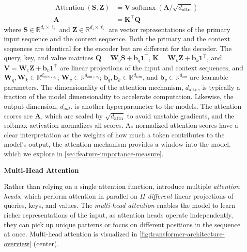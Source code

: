 \begin{equation}
    \begin{aligned}
        \operatorname{Attention}(\mathbf{S},\mathbf{Z}) & = \mathbf{V} \operatorname{softmax}\left(\mathbf{A} / \sqrt{d_{\mathrm{attn}}}\right) \\
        \mathbf{A}                                      & = \mathbf{K}^{\top} \mathbf{Q}
    \end{aligned}
    \label{eq:attention}
\end{equation}
where $\mathbf{S} \in \mathbb{R}^{d_s \times \ell_s}$ and $\mathbf{Z} \in \mathbb{R}^{d_z \times \ell_z}$ are vector representations of the primary input sequence and the context sequence. Both the primary and the context sequences are identical for the encoder but are different for the decoder. The query, key, and value matrices $\mathbf{Q}=\mathbf{W}_q \mathbf{S} + \mathbf{b}_q\mathbf{1}^{\top}$, $\mathbf{K}=\mathbf{W}_k \mathbf{Z} + \mathbf{b}_k\mathbf{1}^{\top}$, and $\mathbf{V}=\mathbf{W}_v \mathbf{Z} + \mathbf{b}_v\mathbf{1}^{\top}$ are linear projections of the input and context sequences, and $\mathbf{W}_q, \mathbf{W}_k \in \mathbb{R}^{d_{\mathrm{attn}\times d_{s}}}$; $\mathbf{W}_v \in \mathbb{R}^{d_{\mathrm{out}\times d_{z}}}$; $\mathbf{b}_q, \mathbf{b}_k \in \mathbb{R}^{d_{\mathrm{attn}}}$, and $\mathbf{b}_v \in \mathbb{R}^{d_{\mathrm{out}}}$ are learnable parameters. The dimensionality of the attention mechanism, $d_{\mathrm{attn}}$, is typically a fraction of the model dimensionality to accelerate computation. Likewise, the output dimension, $d_{out}$, is another hyperparameter to the models. The attention scores are $\mathbf{A}$, which are scaled by $\sqrt{d_{\mathrm{attn}}}$ to avoid unstable gradients, and the softmax activation normalizes all scores. As normalized attention scores have a clear interpretation as the weights of how much a token contributes to the model's output, the attention mechanism provides a window into the model, which we explore in \cref{sec:feature-importance-measure}.

\textbf{Multi-Head Attention}

Rather than relying on a single attention function, \textcite[][6004--6005]{vaswaniAttentionAllYou2017} introduce multiple \emph{attention heads}, which perform attention in parallel on $H$ \emph{different} linear projections of queries, keys, and values. The \emph{multi-head attention} enables the model to learn richer representations of the input, as attention heads operate independently, they can pick up unique patterns or focus on different positions in the sequence at once. Multi-head attention is visualized in \cref{fig:transformer-architecture-overview} (center).

